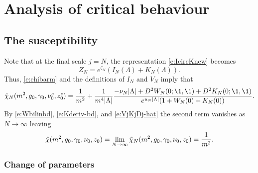 \chapter{Analysis of critical behaviour}


\section{The susceptibility}

Note that at the final scale $j = N$, the representation \eqref{e:IcircKnew}
becomes
\begin{equation}
\label{e:ZNINKN}
Z_N = e^{\zeta_N} (I_N(\Lambda) + K_N(\Lambda)).
\end{equation}
Thus, \eqref{e:chibarm} and the definitions of $I_N$ and $V_N$ imply that
\begin{equation}
\hat\chi_N(m^2, \gcc_0, \gamma_0, \nu_0^c, z_0^c)
	=
\frac{1}{m^2}
	+
\frac{1}{m^4 |\Lambda|}
\frac{-\nu_N |\Lambda| + D^2 W_N(0; \1, \1) + D^2 K_N(0; \1, \1)}{e^{u_N |\Lambda|} (1 + W_N(0) + K_N(0))}.
\end{equation}
By \eqref{e:Wbilinbd}, \eqref{e:Kderiv-bd}, and \eqref{e:VjKjDj-hat} the second term
vanishes as $N\to\infty$ leaving
\begin{equation}
\label{e:chi-m-hat}
\hat\chi(m^2, g_0, \gamma_0, \nu_0, z_0)
	=
\lim_{N\rightarrow\infty} \hat\chi_N(m^2, g_0, \gamma_0, \nu_0, z_0)
	=
\frac{1}{m^2}.
\end{equation}


\subsection{Change of parameters}
\label{sec:nuztilde}


